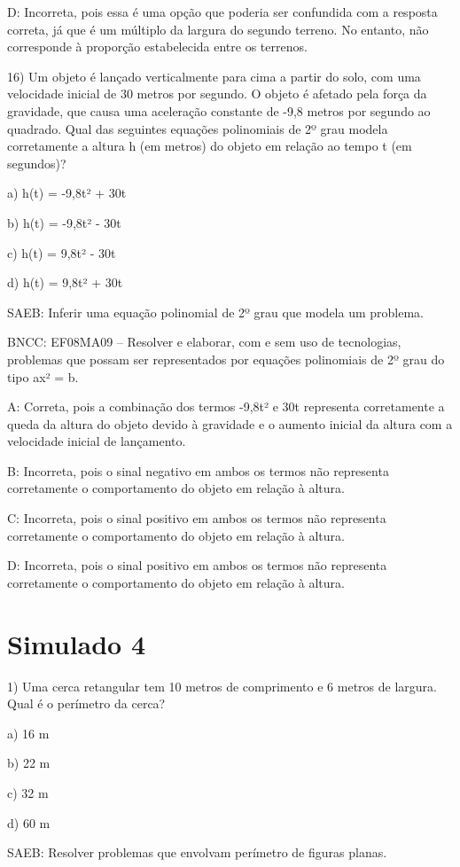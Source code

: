 D: Incorreta, pois essa é uma opção que poderia ser confundida com a
resposta correta, já que é um múltiplo da largura do segundo terreno. No
entanto, não corresponde à proporção estabelecida entre os terrenos.

16) Um objeto é lançado verticalmente para cima a partir do solo, com
uma velocidade inicial de 30 metros por segundo. O objeto é afetado pela
força da gravidade, que causa uma aceleração constante de -9,8 metros
por segundo ao quadrado. Qual das seguintes equações polinomiais de 2º
grau modela corretamente a altura h (em metros) do objeto em relação ao
tempo t (em segundos)?

a) h(t) = -9,8t² + 30t

b) h(t) = -9,8t² - 30t

c) h(t) = 9,8t² - 30t

d) h(t) = 9,8t² + 30t

SAEB: Inferir uma equação polinomial de 2º grau que modela um problema.

BNCC: EF08MA09 -- Resolver e elaborar, com e sem uso de tecnologias,
problemas que possam ser representados por equações polinomiais de 2º
grau do tipo ax² = b.

A: Correta, pois a combinação dos termos -9,8t² e 30t representa
corretamente a queda da altura do objeto devido à gravidade e o aumento
inicial da altura com a velocidade inicial de lançamento.

B: Incorreta, pois o sinal negativo em ambos os termos não representa
corretamente o comportamento do objeto em relação à altura.

C: Incorreta, pois o sinal positivo em ambos os termos não representa
corretamente o comportamento do objeto em relação à altura.

D: Incorreta, pois o sinal positivo em ambos os termos não representa
corretamente o comportamento do objeto em relação à altura.


\section{Simulado 4}

1) Uma cerca retangular tem 10 metros de comprimento e 6 metros de
largura. Qual é o perímetro da cerca?

a) 16 m

b) 22 m

c) 32 m

d) 60 m

SAEB: Resolver problemas que envolvam perímetro de figuras planas.

